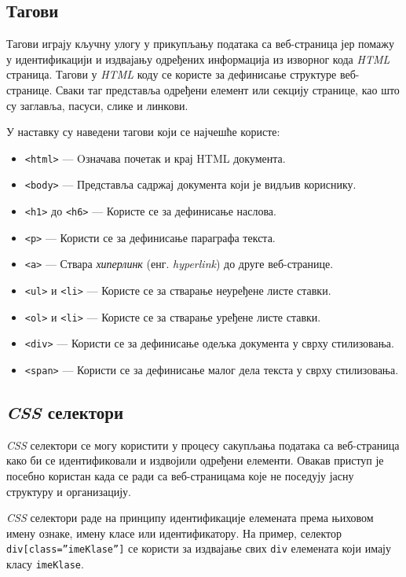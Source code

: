 \documentclass[12pt,oneside]{memoir}
\begin{document}
\subsection{Тагови}
Тагови играју кључну улогу у прикупљању података са веб-страница јер помажу у идентификацији и издвајању одређених информација из изворног кода \textit{HTML} страница. Тагови у \textit{HTML} коду се користе за дефинисање структуре веб-странице. Сваки таг представља одређени елемент или секцију странице, као што су заглавља, пасуси, слике и линкови.

У наставку су наведени тагови који се најчешће користе:
\begin{itemize}
    \item \texttt{<html>} --- Oзначава почетак и крај HTML документа.
    \item \texttt{<body>} --- Представља садржај документа који је видљив кориснику.
    \item \texttt{<h1>} до \texttt{<h6>} --- Користе се за дефинисање наслова.
    \item \texttt{<p>} --- Користи се за дефинисање параграфа текста.
    \item \texttt{<a>} --- Ствара \emph{хиперлинк} (енг. \textit{hyperlink}) до друге веб-странице.
    \item \texttt{<ul>} и \texttt{<li>} --- Користе се за стварање неуређене листе ставки.
    \item \texttt{<ol>} и \texttt{<li>} --- Користе се за стварање уређене листе ставки.
    \item \texttt{<div>} --- Користи се за дефинисање одељка документа у сврху стилизовања.
    \item \texttt{<span>} --- Користи се за дефинисање малог дела текста у сврху стилизовања.
\end{itemize}

\subsection{\textit{CSS} селектори}
\textit{CSS} селектори се могу користити у процесу сакупљања података са веб-страница како би се идентификовали и издвојили одређени елементи. Овакав приступ је посебно користан када се ради са веб-страницама које не поседују јасну структуру и организацију. 

\textit{CSS} селектори раде на принципу идентификације елемената према њиховом имену ознаке, имену класе или идентификатору. На пример, селектор  \texttt{div[class=''imeKlase'']} се користи за издвајање свих \texttt{div} елемената који имају класу \texttt{imeKlase}.
\end{document}
